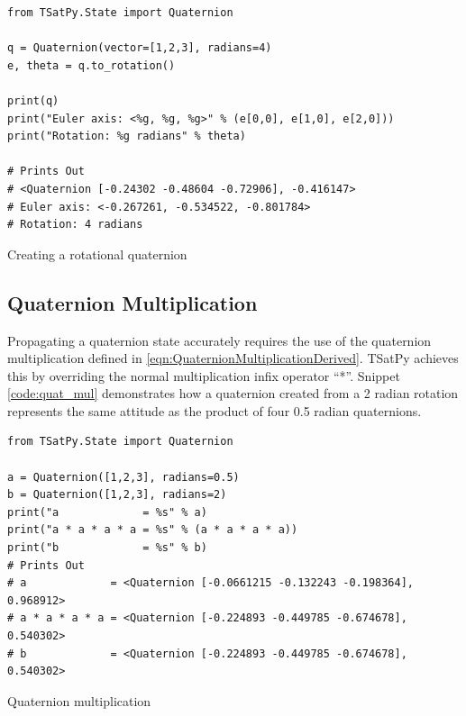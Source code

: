 \begin{listing}[H]
\begin{singlespace}
  \begin{verbatim}
from TSatPy.State import Quaternion

q = Quaternion(vector=[1,2,3], radians=4)
e, theta = q.to_rotation()

print(q)
print("Euler axis: <%g, %g, %g>" % (e[0,0], e[1,0], e[2,0]))
print("Rotation: %g radians" % theta)

# Prints Out
# <Quaternion [-0.24302 -0.48604 -0.72906], -0.416147>
# Euler axis: <-0.267261, -0.534522, -0.801784>
# Rotation: 4 radians
  \end{verbatim}
  \nocite{minted}
\caption{Creating a rotational quaternion}
\label{code:make_quat_rot}
\nocite{minted}
\end{singlespace}
\end{listing}

\subsection{Quaternion Multiplication}
\label{subsec:Implementation-QuaternionMultiplication}

Propagating a quaternion state accurately requires the use of the quaternion multiplication defined in \ref{eqn:QuaternionMultiplicationDerived}.  TSatPy achieves this by overriding the normal multiplication infix operator ``*''.  Snippet
\ref{code:quat_mul} demonstrates how a quaternion created from a 2 radian rotation represents the same attitude as the product of four 0.5 radian quaternions.

\begin{listing}[H]
\begin{singlespace}
  \begin{verbatim}
from TSatPy.State import Quaternion

a = Quaternion([1,2,3], radians=0.5)
b = Quaternion([1,2,3], radians=2)
print("a             = %s" % a)
print("a * a * a * a = %s" % (a * a * a * a))
print("b             = %s" % b)
# Prints Out
# a             = <Quaternion [-0.0661215 -0.132243 -0.198364], 0.968912>
# a * a * a * a = <Quaternion [-0.224893 -0.449785 -0.674678], 0.540302>
# b             = <Quaternion [-0.224893 -0.449785 -0.674678], 0.540302>
  \end{verbatim}
  \nocite{minted}
\caption{Quaternion multiplication}
\label{code:quat_mul}
\nocite{minted}
\end{singlespace}
\end{listing}

